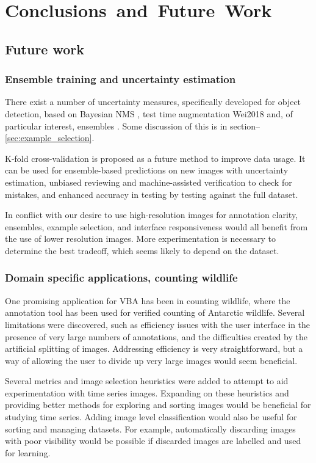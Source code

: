 \chapter{Conclusions~and~Future~Work}
\label{chap:future} 


\section{Future work}
\subsection{Ensemble training and uncertainty estimation}

There exist a number of uncertainty measures, specifically developed for object detection, based on Bayesian \gls{NMS} \cite{Harakeh}, test time augmentation {Wei2018} and, of particular interest, ensembles \cite{Le2018}. Some discussion of this is in section--\ref{sec:example_selection}. 

K-fold cross-validation is proposed as a future method to improve data usage. It can be used for ensemble-based predictions on new images with uncertainty estimation, unbiased reviewing and machine-assisted verification to check for mistakes, and enhanced accuracy in testing by testing against the full dataset.

In conflict with our desire to use high-resolution images for annotation clarity, ensembles, example selection, and interface responsiveness would all benefit from the use of lower resolution images. More experimentation is necessary to determine the best tradeoff, which seems likely to depend on the dataset.

\subsection{Domain specific applications, counting wildlife}

One promising application for \gls{VBA} has been in counting wildlife, where the annotation tool has been used for verified counting of Antarctic wildlife. Several limitations were discovered, such as efficiency issues with the user interface in the presence of very large numbers of annotations, and the difficulties created by the artificial splitting of images. Addressing efficiency is very straightforward, but a way of allowing the user to divide up very large images would seem beneficial.

Several metrics and image selection heuristics were added to attempt to aid experimentation with time series images. Expanding on these heuristics and providing better methods for exploring and sorting images would be beneficial for studying time series. Adding image level classification would also be useful for sorting and managing datasets. For example, automatically discarding images with poor visibility would be possible if discarded images are labelled and used for learning.

